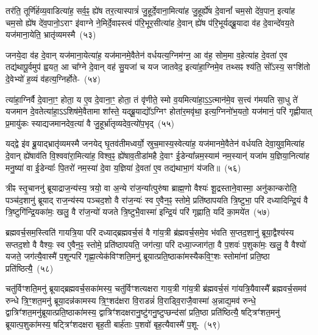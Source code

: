 तर॑ति॒ तूर्णि॑र्\mbox{}हव्य॒वाडित्या॑ह॒ सर्व॒ꣴ॒ ह्ये॑ष तर॒त्यास्पात्रं॑ जु॒हूर्दे॒वा\-ना॒\-मि\-त्या॑ह जु॒हूर्\mbox{}ह्ये॑ष दे॒वानां᳚ चम॒सो दे॑व॒पान॒ इत्या॑ह चम॒सो ह्ये॑ष दे॑व॒पानो॒\-ऽराꣳ इ॑वाग्ने ने॒मिर्दे॒वाꣴस्त्वं प॑रि॒भूर॒सीत्या॑ह दे॒वान् ह्ये॑ष प॑रि॒\-भूर्यद्ब्रू॒\-यादा व॑ह दे॒वान्दे॑वय॒ते यज॑माना॒येति॒ भ्रातृ॑व्यमस्मै~(५३)\ip

जनये॒दा व॑ह दे॒वान् यज॑माना॒येत्या॑ह॒ यज॑मानमे॒वैतेन॑ वर्ध\-य\-त्य॒\-ग्नि\-म॑ग्न॒ आ व॑ह॒ सोम॒मा व॒हेत्या॑ह दे॒वता॑ ए॒व तद्य॑थापू॒र्वमुप॑ ह्वयत॒ आ चा᳚ग्ने दे॒वान् वह॑ सु॒यजा॑ च यज जातवेद॒ इत्या॑हा॒ग्निमे॒व तथ्सꣴ श्य॑ति॒ सो᳚\-ऽस्य॒ सꣳशि॑तो दे॒वेभ्यो॑ ह॒व्यं व॑हत्य॒ग्निर्\mbox{}होते-~(५४)\ip

त्या॑हा॒ग्निर्वै दे॒वाना॒ꣳ॒ होता॒ य ए॒व दे॒वाना॒ꣳ॒ होता॒ तं वृ॑णीते॒ स्मो व॒यमित्या॑हा॒\-ऽ॒\-ऽ॒त्मान॑मे॒व स॒त्त्वं ग॑मयति सा॒धु ते॑ यजमान दे॒वतेत्या॑हा॒\-ऽऽ\-शिष॑मे॒वैतामा शा᳚स्ते॒ यद्ब्रू॒याद्यो᳚\-ऽग्निꣳ होता॑र॒मवृ॑था॒ इत्य॒ग्निनो॑भ॒यतो॒ यज॑मानं॒ परि॑ गृह्णीयात् प्र॒मायु॑कः स्याद्यजमानदेव॒त्या॑ वै जु॒हूर्भ्रा॑तृव्यदेव॒त्यो॑प॒भृद्~(५५)\ip

यद्द्वे इ॑व ब्रू॒याद्भ्रातृ॑व्यमस्मै जनयेद् घृ॒तव॑तीमध्वर्यो॒ स्रुच॒मास्य॒\-स्वे\-त्या॑ह॒ यज॑मानमे॒वैतेन॑ वर्धयति देवा॒युव॒मित्या॑ह दे॒वान् ह्ये॑षा\-व॑ति वि॒श्व\-वा॑रा॒मित्या॑ह॒ विश्व॒ꣴ॒ ह्ये॑षाव॒तीडा॑महै दे॒वाꣳ ई॒डेन्या᳚न्नम॒स्याम॑ नम॒स्यान्॑ यजा॑म य॒ज्ञिया॒नित्या॑ह मनु॒ष्या॑ वा ई॒डेन्याः᳚ पि॒तरो॑ नम॒स्या॑ दे॒वा य॒ज्ञिया॑ दे॒वता॑ ए॒व तद्य॑थाभा॒गं य॑जति॥~(५६)\ip

{\anuvakamend[{विप्रा॑नुमदित॒ इत्या॑ह च॒नास्मै॒ होतो॑प॒भृद्दे॒वता॑ ए॒व त्रीणि॑ च}]}

त्रीꣴ स्तृ॒चाननु॑ ब्रूयाद्राज॒न्य॑स्य॒ त्रयो॒ वा अ॒न्ये रा॑ज॒न्या᳚त्पुरु॑षा ब्राह्म॒णो वैश्यः॑ शू॒द्रस्ताने॒वास्मा॒ अनु॑कान्करोति॒ पञ्च॑द॒शानु॑ ब्रूयाद् राज॒न्य॑स्य पञ्चद॒शो वै रा॑ज॒न्यः॑ स्व ए॒वैन॒ꣴ॒ स्तोमे॒ प्रति॑\-ष्ठापयति त्रि॒ष्टुभा॒ परि॑ दध्यादिन्द्रि॒यं वै त्रि॒ष्टुगि॑न्द्रि॒यका॑मः॒ खलु॒ वै रा॑ज॒न्यो॑ यजते त्रि॒ष्टुभै॒वास्मा॑ इन्द्रि॒यं परि॑ गृह्णाति॒ यदि॑ का॒मये॑त~(५७)\ip

ब्रह्मवर्च॒सम॒स्त्विति॑ गायत्रि॒या परि॑ दध्याद्ब्रह्मवर्च॒सं वै गा॑य॒त्री ब्र॑ह्मवर्च॒समे॒व भ॑वति स॒प्तद॒शानु॑ ब्रूया॒द्वैश्य॑स्य सप्तद॒शो वै वैश्यः॒ स्व ए॒वैन॒ꣴ॒ स्तोमे॒ प्रति॑\-ष्ठापयति॒ जग॑त्या॒ परि॑ दध्या॒ज्जाग॑ता॒ वै प॒शवः॑ प॒शुका॑मः॒ खलु॒ वै वैश्यो॑ यजते॒ जग॑त्यै॒वास्मै॑ प॒शून्परि॑ गृह्णा॒त्येक॑विꣳशति॒मनु॑ ब्रूयात्प्रति॒ष्ठाका॑मस्यैकवि॒ꣳ॒शः स्तोमा॑नां प्रति॒ष्ठा प्रति॑ष्ठित्यै॒~(५८)\ip

चतु॑र्विꣳशति॒मनु॑ ब्रूयाद्ब्रह्मवर्च॒सका॑मस्य॒ चतु॑र्विꣳशत्यक्षरा गाय॒त्री गा॑य॒त्री ब्र॑ह्मवर्च॒सं गा॑यत्रि॒यैवास्मै᳚ ब्रह्मवर्च॒समव॑ रुन्धे त्रि॒ꣳ॒शत॒\-मनु॑ ब्रूया॒दन्न॑कामस्य त्रि॒ꣳ॒शद॑क्षरा वि॒राडन्नं॑ वि॒राड्वि॒रा\-जै॒\-वा\-स्मा॑ अ॒न्नाद्\-य॒\-मव॑ रुन्धे॒ द्वात्रिꣳ॑शत॒\-मनु॑\-ब्रूयात्प्र\-ति॒ष्ठा\-का॑मस्य॒ द्वात्रिꣳ॑शद\-क्षरा\-नु॒ष्टु॑ग\-नु॒ष्टुप्छन्द॑सां प्रति॒ष्ठा प्रति॑ष्ठित्यै॒ षट्त्रिꣳ॑शत॒मनु॑ ब्रूयात्प॒शुका॑मस्य॒ षट्त्रिꣳ॑शदक्षरा बृह॒ती बार्\mbox{}ह॑ताः प॒शवो॑ बृह॒त्यैवास्मै॑ प॒शू-~(५९)\ip


